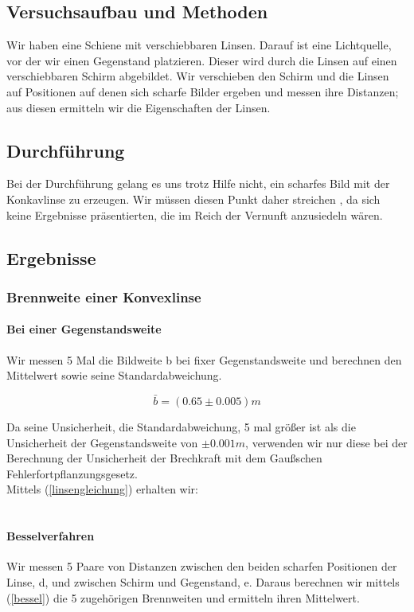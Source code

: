 \documentclass{article}
\begin{document}
\subsection{Versuchsaufbau und Methoden}
Wir haben eine Schiene mit verschiebbaren Linsen. Darauf ist eine Lichtquelle, vor der wir einen Gegenstand platzieren. Dieser wird durch die Linsen auf einen verschiebbaren Schirm abgebildet. Wir verschieben den Schirm und die Linsen auf Positionen auf denen sich scharfe Bilder ergeben und messen ihre Distanzen; aus diesen ermitteln wir die Eigenschaften der Linsen.
\subsection{Durchführung}
Bei der Durchführung gelang es uns trotz Hilfe nicht, ein scharfes Bild mit der Konkavlinse zu erzeugen. Wir müssen diesen Punkt daher streichen	, da sich keine Ergebnisse präsentierten, die im Reich der Vernunft anzusiedeln wären.
\subsection{Ergebnisse}
\subsubsection*{Brennweite einer Konvexlinse}
\paragraph{Bei einer Gegenstandsweite}

Wir messen 5 Mal die Bildweite b bei fixer Gegenstandsweite und berechnen den Mittelwert sowie seine Standardabweichung.

$$\bar{b}=(0.65 \pm 0.005)m$$

Da seine Unsicherheit, die Standardabweichung, 5 mal größer ist als die Unsicherheit der Gegenstandsweite von $\pm 0.001m$, verwenden wir nur diese bei der Berechnung der Unsicherheit der Brechkraft mit dem Gaußschen Fehlerfortpflanzungsgesetz. \\
Mittels (\ref{linsengleichung}) erhalten wir:\\
\\
\paragraph{Besselverfahren}
Wir messen 5 Paare von Distanzen zwischen den beiden scharfen Positionen der Linse, d, und zwischen Schirm und Gegenstand, e. Daraus berechnen wir mittels (\ref{bessel}) die 5 zugehörigen Brennweiten und ermitteln ihren Mittelwert.\\
\\
\end{document}
